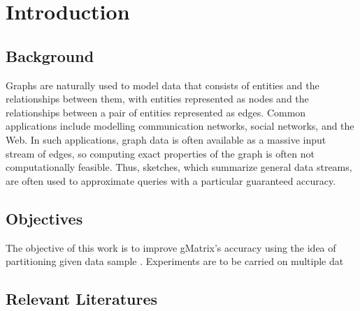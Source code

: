 
\chapter{Introduction}  %

\ifpdf
    \graphicspath{{Chapter1/Figs/Raster/}{Chapter1/Figs/PDF/}{Chapter1/Figs/}}
\else
    \graphicspath{{Chapter1/Figs/Vector/}{Chapter1/Figs/}}
\fi


\section{Background} %

Graphs are naturally used to model data that consists of entities and the relationships between them, with entities represented as nodes and the relationships between a pair of entities represented as edges. Common applications include modelling communication networks, social networks, and the Web. In such applications, graph data is often available as a massive input stream of edges, so computing exact properties of the graph is often not computationally feasible. Thus, sketches, which summarize general data streams, are often used to approximate queries with a particular guaranteed accuracy.


\section{Objectives} %

The objective of this work is to improve gMatrix's \cite{khan} accuracy using the idea of partitioning given data sample \cite{DBLP}. Experiments are to be carried on multiple dat

\section{Relevant Literatures}  %
\label{section1.3}

